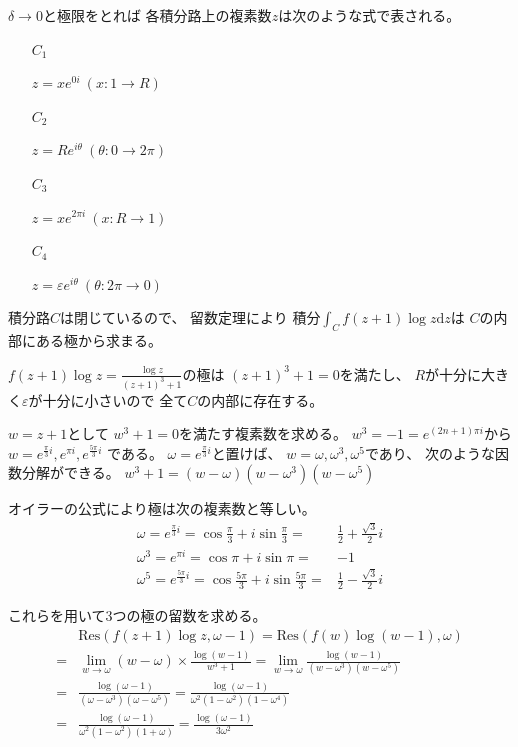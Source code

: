 \documentclass[12pt,b5paper]{ltjsarticle}
\begin{document}
$\delta \to 0$と極限をとれば
各積分路上の複素数$z$は次のような式で表される。
\begin{enumerate}
 \item [$C_1$]

       $z=x e^{0i} \ (x:1 \to R)$

 \item [$C_2$]

       $z=Re^{i\theta} \ (\theta : 0\to 2\pi)$

 \item [$C_3$]

       $z=x e^{2\pi i} \ (x:R\to1)$

 \item [$C_4$]

       $z=\varepsilon e^{i\theta} \ (\theta : 2\pi \to 0)$

\end{enumerate}


積分路$C$は閉じているので、
留数定理により
積分$\int_{C}f(z+1)\log{z}\mathrm{d}z$は
$C$の内部にある極から求まる。

$f(z+1)\log{z}=\frac{\log{z}}{(z+1)^3+1}$の極は
$(z+1)^3+1=0$を満たし、
$R$が十分に大きく$\varepsilon$が十分に小さいので
全て$C$の内部に存在する。

$w=z+1$として
$w^3+1=0$を満たす複素数を求める。
$w^3=-1=e^{(2n+1)\pi i}$から
$w=e^{\frac{\pi}{3}i},e^{\pi i},e^{\frac{5\pi}{3}i}$
である。
$\omega = e^{\frac{\pi}{3}i}$と置けば、
$w= \omega,\omega^3,\omega^5$であり、
次のような因数分解ができる。
$w^3+1 = (w-\omega)(w-\omega^3)(w-\omega^5)$


オイラーの公式により極は次の複素数と等しい。
\begin{align}
 \omega
 = e^{\frac{\pi}{3}i}
 = \cos{\frac{\pi}{3}}+i\sin{\frac{\pi}{3}}
 =& \frac{1}{2}+\frac{\sqrt{3}}{2}i\\
 \omega^3
 = e^{\pi i}
 = \cos{\pi}+i\sin{\pi}
 =& -1\\
 \omega^5
 = e^{\frac{5\pi}{3}i}
 = \cos{\frac{5\pi}{3}}+i\sin{\frac{5\pi}{3}}
 =& \frac{1}{2}-\frac{\sqrt{3}}{2}i
\end{align}

これらを用いて3つの極の留数を求める。
\begin{align}
 & \mathrm{Res}(f(z+1)\log{z},\omega-1)
  =
 \mathrm{Res}(f(w)\log{(w-1)},\omega)\\
 =&
 \lim_{w\to \omega}(w-\omega)\times \frac{\log{(w-1)}}{w^3+1}
  =
 \lim_{w\to \omega} \frac{\log{(w-1)}}{(w-\omega^3)(w-\omega^5)}\\
 =&
 \frac{\log{(\omega-1)}}{(\omega-\omega^3)(\omega-\omega^5)}
 =
 \frac{\log{(\omega-1)}}{\omega^2(1-\omega^2)(1-\omega^4)}
 \\
 =&
 \frac{\log{(\omega-1)}}{\omega^2(1-\omega^2)(1+\omega)}
 = \frac{\log{(\omega-1)}}{3\omega^2}
\end{align}
\end{document}
